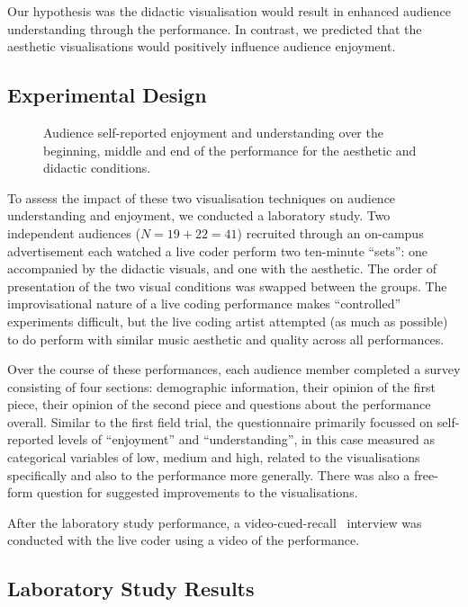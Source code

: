 \documentclass{sig-alternate}
\begin{document}
Our hypothesis was the didactic visualisation would result in enhanced
audience understanding through the performance. In contrast, we
predicted that the aesthetic visualisations would positively influence
audience enjoyment.

\subsection{Experimental Design}

\begin{figure*}
\centering
{}
\caption{Audience self-reported enjoyment and understanding over the
beginning, middle and end of the performance for the aesthetic and
didactic conditions.}
\label{fig:enjoyment-understanding}
\end{figure*}

To assess the impact of these two visualisation techniques on audience
understanding and enjoyment, we conducted a laboratory study. Two
independent audiences ($N=19+22=41$) recruited through an on-campus
advertisement each watched a live coder perform two ten-minute
``sets'': one accompanied by the didactic visuals, and one with the
aesthetic. The order of presentation of the two visual conditions was
swapped between the groups. The improvisational nature of a live
coding performance makes ``controlled'' experiments difficult, but the
live coding artist attempted (as much as possible) to do perform with
similar music aesthetic and quality across all performances.

Over the course of these performances, each audience member completed
a survey consisting of four sections: demographic information, their
opinion of the first piece, their opinion of the second piece and
questions about the performance overall. Similar to the first field
trial, the questionnaire primarily focussed on self-reported levels of
``enjoyment'' and ``understanding'', in this case measured as
categorical variables of low, medium and high, related to the
visualisations specifically and also to the performance more
generally. There was also a free-form question for suggested
improvements to the visualisations.

After the laboratory study performance, a
video-cued-recall~\cite{Suchman:1992tk} interview was conducted with
the live coder using a video of the performance.

\subsection{Laboratory Study Results}
\end{document}
